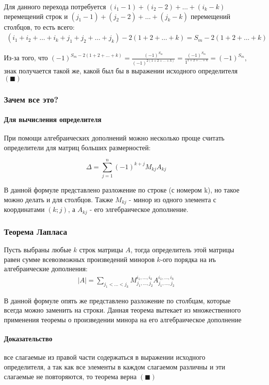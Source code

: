 \documentclass[class=article,a4paper,12pt,crop=false]{standalone}
\begin{document}
Для данного перехода потребуется $(i_1 - 1) + (i_2 - 2) + \dots + (i_k - k)$ перемещений строк и
$(j_1 - 1) + (j_2 - 2) + \dots + (j_k - k)$ перемещений столбцов, то есть всего:
\begin{eqnarray}
  (i_1 + i_2 + \dots + i_k + j_1 + j_2 + \dots + j_k) - 2(1 + 2 + \dots + k) = S_m - 2(1 + 2 + \dots + k)
\end{eqnarray}

Из-за того, что $(-1)^{S_m - 2(1 + 2 + \dots + k)} = \frac{(-1)^{S_m}}{(-1)^{2(1 + 2 + \dots + k)}}
=\frac{(-1)^{S_m}}{1^{1 + 2 + \dots + k}} = (-1)^{S_m}$, знак получается такой же, какой был бы
в выражении исходного определителя $(\blacksquare)$

\subsubsection{Зачем все это?}

\paragraph{Для вычисления определителя}

При помощи алгебраических дополнений можно несколько проще считать определители для
матриц больших размерностей:

\begin{equation}
  \Delta = \sum\limits_{j=1}^{n}(-1)^{k+j}M_{kj}A_{kj}
\end{equation}

В данной формуле представлено разложение по строке (с номером k), но такое можно
делать и для столбцов. Также $M_{kj}$ - минор из одного элемента с координатами $(k; j)$,
а $A_{kj}$ - его элгебраическое дополнение.

\subsubsection{Теорема Лапласа}

Пусть выбраны любые $k$ строк матрицы $A$, тогда определитель этой матрицы равен сумме всевозможных
произведений миноров $k$-ого порядка на иъ алгебраические дополнения:
\begin{eqnarray}
  |A| = \sum\limits_{j_1 < \dots < j_k}{M_{j_1,\dots ,j_2}^{i_1,\dots ,i_k}A_{j_1,\dots ,j_2}^{i_1,\dots ,i_k}}
\end{eqnarray}

В данной формуле опять же представлено разложение по столбцам, которые всегда можно заменить на строки.
Данная теорема вытекает из множественного применения теоремы о произведении минора на его алгебраическое
дополнение

\paragraph{Доказательство} все слагаемые из правой части содержаться в выражении исходного определителя,
а так как все элементы в каждом слагаемом различны и эти слагаемые не повторяются, то теорема верна $(\blacksquare)$
\end{document}
